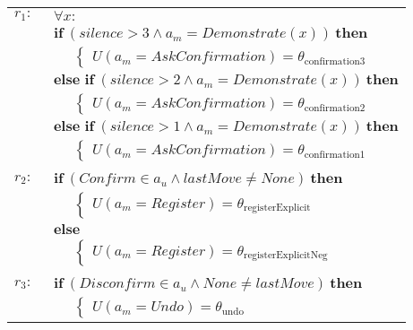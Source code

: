 \begin{small}
\begin{longtable}{p{1cm}l} 
$r_{1}: \ \ $ &  $\forall x : $ \\ & $\textbf{if} \ (\mathit{silence}\!>\!\mathit{3} \land \mathit{a_m}\!=\!\mathit{Demonstrate}(x)) \ \textbf{then}$ \\
& $\;\;\;\;\; \begin{cases}U(\mathit{a_m}\!=\!\mathit{AskConfirmation})\!=\!\theta_{\mathrm{confirmation3}}\end{cases}$ \\ 
& $\textbf{else if} \ (\mathit{silence}\!>\!\mathit{2} \land \mathit{a_m}\!=\!\mathit{Demonstrate}(x)) \ \textbf{then}$ \\
& $\;\;\;\;\; \begin{cases}U(\mathit{a_m}\!=\!\mathit{AskConfirmation})\!=\!\theta_{\mathrm{confirmation2}}\end{cases}$ \\ 
& $\textbf{else if} \ (\mathit{silence}\!>\!\mathit{1} \land \mathit{a_m}\!=\!\mathit{Demonstrate}(x)) \ \textbf{then}$ \\
& $\;\;\;\;\; \begin{cases}U(\mathit{a_m}\!=\!\mathit{AskConfirmation})\!=\!\theta_{\mathrm{confirmation1}}\end{cases}$ \\ \\[-2mm]
$r_{2}: \ \ $ & $\textbf{if} \ (\mathit{Confirm}\!\in\!\mathit{a_u} \land \mathit{lastMove}\!\neq\!\mathit{None}) \ \textbf{then}$ \\
& $\;\;\;\;\; \begin{cases}U(\mathit{a_m}\!=\!\mathit{Register})\!=\!\theta_{\mathrm{registerExplicit}}\end{cases}$\\ 
& $\textbf{else}$ \\
& $\;\;\;\;\; \begin{cases}U(\mathit{a_m}\!=\!\mathit{Register})\!=\!\theta_{\mathrm{registerExplicitNeg}}\end{cases}$ \\[3mm]\\[-2mm]
$r_{3}: \ \ $& $\textbf{if} \ (\mathit{Disconfirm}\!\in\!\mathit{a_u} \land \mathit{None}\!\neq\!\mathit{lastMove}) \ \textbf{then}$ \\
& $\;\;\;\;\; \begin{cases}U(\mathit{a_m}\!=\!\mathit{Undo})\!=\!\theta_{\mathrm{undo}}\end{cases}$ \\ 

\end{longtable}
\end{small}
